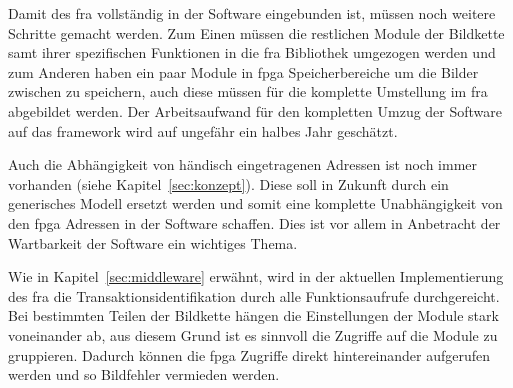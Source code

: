 
Damit des \ac{fra} vollständig in der Software eingebunden ist, müssen noch weitere Schritte gemacht werden. Zum Einen müssen die restlichen Module der Bildkette samt ihrer spezifischen Funktionen in die \ac{fra} Bibliothek umgezogen werden und zum Anderen haben ein paar Module in \ac{fpga} Speicherbereiche um die Bilder zwischen zu speichern, auch diese müssen für die komplette Umstellung im \ac{fra} abgebildet werden. Der Arbeitsaufwand für den kompletten Umzug der Software auf das \gls{framework} wird auf ungefähr ein halbes Jahr geschätzt.

Auch die Abhängigkeit von händisch eingetragenen Adressen ist noch immer vorhanden (siehe Kapitel~\ref{sec:konzept}). Diese soll in Zukunft durch ein generisches Modell ersetzt werden und somit eine komplette Unabhängigkeit von den \ac{fpga} Adressen in der Software schaffen. Dies ist vor allem in Anbetracht der Wartbarkeit der Software ein wichtiges Thema.

Wie in Kapitel~\ref{sec:middleware} erwähnt, wird in der aktuellen Implementierung des \ac{fra} die Transaktionsidentifikation durch alle Funktionsaufrufe durchgereicht. Bei bestimmten Teilen der Bildkette hängen die Einstellungen der Module stark voneinander ab, aus diesem Grund ist es sinnvoll die Zugriffe auf die Module zu gruppieren. Dadurch können die \ac{fpga} Zugriffe direkt hintereinander aufgerufen werden und so Bildfehler vermieden werden.




















